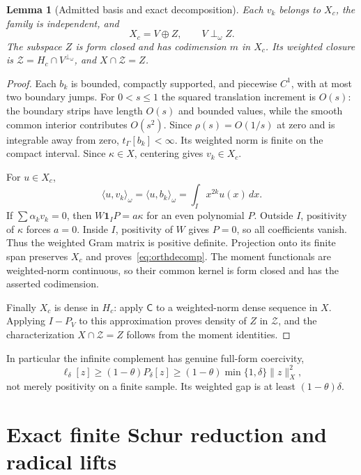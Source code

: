 \documentclass[11pt,a4paper]{article}
\numberwithin{equation}{section}
\newtheorem{lemma}[theorem]{Lemma}
\theoremstyle{remark}
\newcommand{\tg}{t_{\Gamma}}
\newcommand{\ip}[2]{\langle #1,#2\rangle}
\newcommand{\norm}[1]{\lVert #1\rVert}
\newcommand{\one}{\mathbf 1}
\newcommand{\Zc}{\mathcal Z}
\begin{document}
\begin{lemma}[Admitted basis and exact decomposition]\label{lem:VZ}
Each $v_k$ belongs to $X_c$, the family is independent, and
\begin{equation}\label{eq:orthdecomp}
 X_c=V\oplus Z,\qquad V\perp_\omega Z.
\end{equation}
The subspace $Z$ is form closed and has codimension $m$ in $X_c$. Its weighted closure is
$\Zc=H_c\cap V^{\perp_\omega}$, and $X\cap\Zc=Z$.
\end{lemma}
\begin{proof}
Each $b_k$ is bounded, compactly supported, and piecewise $C^1$, with at most two boundary jumps. For $0<s\le1$ the squared translation increment is $O(s)$: the boundary strips have length $O(s)$ and bounded values, while the smooth common interior contributes $O(s^2)$. Since $\rho(s)=O(1/s)$ at zero and is integrable away from zero, $\tg[b_k]<\infty$. Its weighted norm is finite on the compact interval. Since $\kappa\in X$, centering gives $v_k\in X_c$.

For $u\in X_c$,
\[
 \ip u{v_k}_\omega=\ip u{b_k}_\omega
                    =\int_Ix^{2k}u(x)\,dx.
\]
If $\sum\alpha_kv_k=0$, then $W\one_IP=a\kappa$ for an even polynomial $P$. Outside $I$, positivity of $\kappa$ forces $a=0$. Inside $I$, positivity of $W$ gives $P=0$, so all coefficients vanish. Thus the weighted Gram matrix is positive definite. Projection onto its finite span preserves $X_c$ and proves~\eqref{eq:orthdecomp}. The moment functionals are weighted-norm continuous, so their common kernel is form closed and has the asserted codimension.

Finally $X_c$ is dense in $H_c$: apply $\mathsf C$ to a weighted-norm dense sequence in $X$. Applying $I-P_V$ to this approximation proves density of $Z$ in $\Zc$, and the characterization $X\cap\Zc=Z$ follows from the moment identities.
\end{proof}

In particular the infinite complement has genuine full-form coercivity,
\begin{equation}\label{eq:Zcoercive}
 \ell_\delta[z]\ge(1-\theta)P_\delta[z]
 \ge(1-\theta)\min\{1,\delta\}\norm z_X^2,
\end{equation}
not merely positivity on a finite sample. Its weighted gap is at least $(1-\theta)\delta$.

\section{Exact finite Schur reduction and radical lifts}\label{sec:schur}
\end{document}
